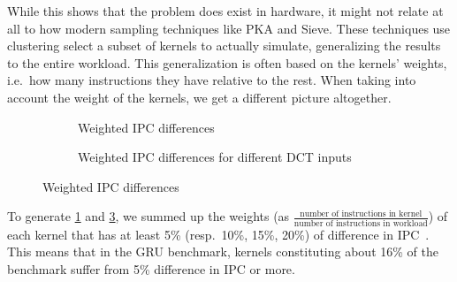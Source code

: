 While this shows that the problem does exist in hardware, it might not relate at all to how modern sampling techniques like PKA\cite{pks} and Sieve\cite{sieve}.
These techniques use clustering select a subset of kernels to actually simulate, generalizing the results to the entire workload.
This generalization is often based on the kernels' weights, i.e.\ how many instructions they have relative to the rest.
When taking into account the weight of the kernels, we get a different picture altogether.

\begin{figure}[t]
    \centering
    \begin{subfigure}{\textwidth}
        \begin{minipage}[c]{0.45\textwidth}
            \resizebox{\textwidth}{!}{}
        \end{minipage}
        \begin{minipage}[c]{0.45\textwidth}
            \resizebox{\textwidth}{!}{}
        \end{minipage}
        \caption{Weighted IPC differences}
        \label{fig:weight_ipc_diff}
    \end{subfigure}
    \centering
    \begin{subfigure}{\textwidth}
        \begin{minipage}[c]{0.45\textwidth}
            \resizebox{\textwidth}{!}{}
        \end{minipage}
        \begin{minipage}[c]{0.45\textwidth}
            \resizebox{\textwidth}{!}{}
        \end{minipage}
        \caption{Weighted IPC differences for different DCT inputs}
        \label{fig:weight_ipc_dct}
    \end{subfigure}
    \caption{Weighted IPC differences}
\end{figure}

To generate \cref{fig:weight_ipc_diff} and \cref{fig:weight_ipc_dct}, we summed up the weights (as $\frac{\text{number of instructions in kernel}}{\text{number of instructions in workload}}$) of each kernel that has at least 5\% (resp.\ 10\%, 15\%, 20\%) of difference in IPC\ .
This means that in the GRU benchmark, kernels constituting about 16\% of the benchmark suffer from 5\% difference in IPC or more.

\FloatBarrier